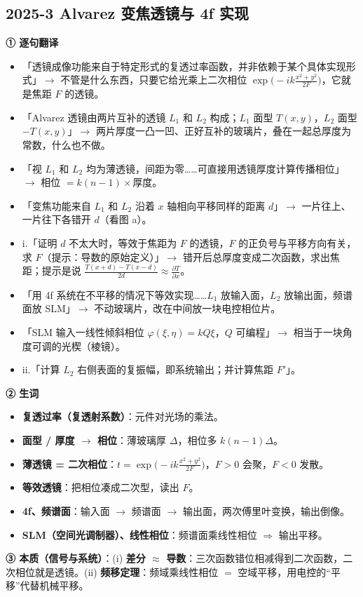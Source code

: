 \subsection{2025-3 Alvarez 变焦透镜与 4f 实现}\label{ex:2025-3}
\label{rd:2025-3}
\begin{idea}[读题：这道题在说什么]
\textbf{① 逐句翻译}
\begin{itemize}
\item 「透镜成像功能来自于特定形式的复透过率函数，并非依赖于某个具体实现形式」$\to$ 不管是什么东西，只要它给光乘上二次相位 $\exp\!\big(-ik\frac{x^2+y^2}{2F}\big)$，它就是焦距 $F$ 的透镜。
\item 「Alvarez 透镜由两片互补的透镜 $L_1$ 和 $L_2$ 构成；$L_1$ 面型 $T(x,y)$，$L_2$ 面型 $-T(x,y)$」$\to$ 两片厚度一凸一凹、正好互补的玻璃片，叠在一起总厚度为常数，什么也不做。
\item 「视 $L_1$ 和 $L_2$ 均为薄透镜，间距为零……可直接用透镜厚度计算传播相位」$\to$ 相位 $=k(n-1)\times$厚度。
\item 「变焦功能来自 $L_1$ 和 $L_2$ 沿着 $x$ 轴相向平移同样的距离 $d$」$\to$ 一片往上、一片往下各错开 $d$（看图 a）。
\item i.「证明 $d$ 不太大时，等效于焦距为 $F$ 的透镜，$F$ 的正负号与平移方向有关，求 $F$（提示：导数的原始定义）」$\to$ 错开后总厚度变成二次函数，求出焦距；提示是说 $\frac{T(x+d)-T(x-d)}{2d}\approx\frac{\partial T}{\partial x}$。
\item 「用 4f 系统在不平移的情况下等效实现……$L_1$ 放输入面，$L_2$ 放输出面，频谱面放 SLM」$\to$ 不动玻璃片，改在中间放一块电控相位片。
\item 「SLM 输入一线性倾斜相位 $\varphi(\xi,\eta)=kQ\xi$，$Q$ 可编程」$\to$ 相当于一块角度可调的光楔（棱镜）。
\item ii.「计算 $L_2$ 右侧表面的复振幅，即系统输出；并计算焦距 $F'$」。
\end{itemize}
\textbf{② 生词}
\begin{itemize}
\item \textbf{复透过率（复透射系数）}：元件对光场的乘法。
\item \textbf{面型 / 厚度 $\to$ 相位}：薄玻璃厚 $\Delta$，相位多 $k(n-1)\Delta$。
\item \textbf{薄透镜 = 二次相位}：$t=\exp\!\big(-ik\frac{x^2+y^2}{2F}\big)$，$F>0$ 会聚，$F<0$ 发散。
\item \textbf{等效透镜}：把相位凑成二次型，读出 $F$。
\item \textbf{4f、频谱面}：输入面 $\to$ 频谱面 $\to$ 输出面，两次傅里叶变换，输出倒像。
\item \textbf{SLM（空间光调制器）、线性相位}：频谱面乘线性相位 $\Rightarrow$ 输出平移。
\end{itemize}
\textbf{③ 本质（信号与系统）}：(i) \textbf{差分 $\approx$ 导数}：三次函数错位相减得到二次函数，二次相位就是透镜。(ii) \textbf{频移定理}：频域乘线性相位 $=$ 空域平移，用电控的“平移”代替机械平移。


\end{idea}
